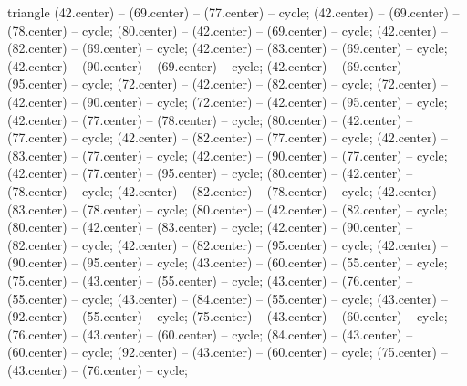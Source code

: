 \begin{pgfonlayer}{triangle}
 (42.center) -- (69.center) -- (77.center) -- cycle; 
 (42.center) -- (69.center) -- (78.center) -- cycle; 
 (80.center) -- (42.center) -- (69.center) -- cycle; 
 (42.center) -- (82.center) -- (69.center) -- cycle; 
 (42.center) -- (83.center) -- (69.center) -- cycle; 
 (42.center) -- (90.center) -- (69.center) -- cycle; 
 (42.center) -- (69.center) -- (95.center) -- cycle; 
 (72.center) -- (42.center) -- (82.center) -- cycle; 
 (72.center) -- (42.center) -- (90.center) -- cycle; 
 (72.center) -- (42.center) -- (95.center) -- cycle; 
 (42.center) -- (77.center) -- (78.center) -- cycle; 
 (80.center) -- (42.center) -- (77.center) -- cycle; 
 (42.center) -- (82.center) -- (77.center) -- cycle; 
 (42.center) -- (83.center) -- (77.center) -- cycle; 
 (42.center) -- (90.center) -- (77.center) -- cycle; 
 (42.center) -- (77.center) -- (95.center) -- cycle; 
 (80.center) -- (42.center) -- (78.center) -- cycle; 
 (42.center) -- (82.center) -- (78.center) -- cycle; 
 (42.center) -- (83.center) -- (78.center) -- cycle; 
 (80.center) -- (42.center) -- (82.center) -- cycle; 
 (80.center) -- (42.center) -- (83.center) -- cycle; 
 (42.center) -- (90.center) -- (82.center) -- cycle; 
 (42.center) -- (82.center) -- (95.center) -- cycle; 
 (42.center) -- (90.center) -- (95.center) -- cycle; 
 (43.center) -- (60.center) -- (55.center) -- cycle; 
 (75.center) -- (43.center) -- (55.center) -- cycle; 
 (43.center) -- (76.center) -- (55.center) -- cycle; 
 (43.center) -- (84.center) -- (55.center) -- cycle; 
 (43.center) -- (92.center) -- (55.center) -- cycle; 
 (75.center) -- (43.center) -- (60.center) -- cycle; 
 (76.center) -- (43.center) -- (60.center) -- cycle; 
 (84.center) -- (43.center) -- (60.center) -- cycle; 
 (92.center) -- (43.center) -- (60.center) -- cycle; 
 (75.center) -- (43.center) -- (76.center) -- cycle; 

\end{pgfonlayer}

